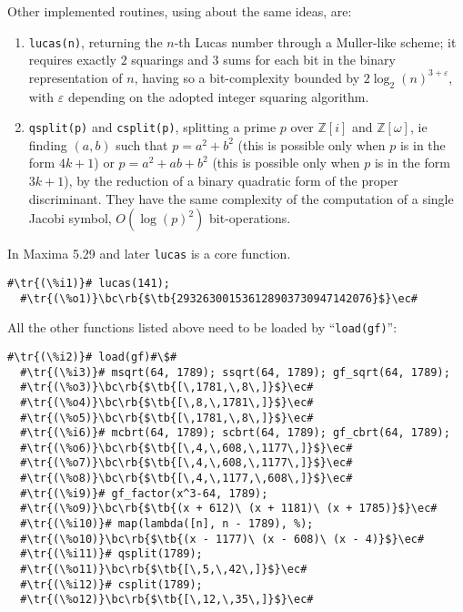 \documentclass[a4paper,11pt,leqno,fleqn]{artikel3}
\newcommand{\bc}{\begin{center}}
\newcommand{\ec}{\end{center}}
\newcommand{\tr}[1]{\textcolor{red}{#1}}
\newcommand{\tb}[1]{\textcolor{blue}{#1}}
\newcommand{\rb}[1]{\raisebox{2mm}[0mm][1mm]{#1}}
\begin{document}
Other implemented routines, using about the same ideas, are:
\begin{enumerate}
\item \verb!lucas(n)!, returning the $n$-th Lucas number through a Muller-like scheme; it requires exactly $2$ squarings and $3$ sums for each bit in the binary representation of $n$, having so a bit-complexity bounded by $2\log_2(n)^{3+\varepsilon}$, with $\varepsilon$ depending on the adopted integer squaring algorithm.
\item \verb!qsplit(p)! and \verb!csplit(p)!, splitting a prime $p$ over $\mathbb{Z}[i]$ and $\mathbb{Z}[\omega]$, ie finding $(a,b)$ such that $p=a^2+b^2$ (this is possible only when $p$ is in the form $4k+1$) or $p=a^2+ab+b^2$ (this is possible only when $p$ is in the form $3k+1$), by the reduction of a binary quadratic form of the proper discriminant. They have the same complexity of the computation of a single Jacobi symbol, $O(\log(p)^2)$ bit-operations.
\end{enumerate}
\vspace{1cm}

In Maxima 5.29 and later \verb!lucas! is a core function.

\vspace*{2mm}
\begin{lstlisting}[escapechar=\#]
  #\tr{(\%i1)}# lucas(141);
  #\tr{(\%o1)}\bc\rb{$\tb{293263001536128903730947142076}$}\ec#
\end{lstlisting}

\vspace*{4mm}
All the other functions listed above need to be loaded by ``\verb!load(gf)!'':

\pagebreak
\begin{lstlisting}[escapechar=\#]
  #\tr{(\%i2)}# load(gf)#\$#
  #\tr{(\%i3)}# msqrt(64, 1789); ssqrt(64, 1789); gf_sqrt(64, 1789);
  #\tr{(\%o3)}\bc\rb{$\tb{[\,1781,\,8\,]}$}\ec#
  #\tr{(\%o4)}\bc\rb{$\tb{[\,8,\,1781\,]}$}\ec#
  #\tr{(\%o5)}\bc\rb{$\tb{[\,1781,\,8\,]}$}\ec#
  #\tr{(\%i6)}# mcbrt(64, 1789); scbrt(64, 1789); gf_cbrt(64, 1789);
  #\tr{(\%o6)}\bc\rb{$\tb{[\,4,\,608,\,1177\,]}$}\ec#
  #\tr{(\%o7)}\bc\rb{$\tb{[\,4,\,608,\,1177\,]}$}\ec#
  #\tr{(\%o8)}\bc\rb{$\tb{[\,4,\,1177,\,608\,]}$}\ec#
  #\tr{(\%i9)}# gf_factor(x^3-64, 1789);
  #\tr{(\%o9)}\bc\rb{$\tb{(x + 612)\ (x + 1181)\ (x + 1785)}$}\ec#
  #\tr{(\%i10)}# map(lambda([n], n - 1789), %);
  #\tr{(\%o10)}\bc\rb{$\tb{(x - 1177)\ (x - 608)\ (x - 4)}$}\ec#
  #\tr{(\%i11)}# qsplit(1789);
  #\tr{(\%o11)}\bc\rb{$\tb{[\,5,\,42\,]}$}\ec#
  #\tr{(\%i12)}# csplit(1789);
  #\tr{(\%o12)}\bc\rb{$\tb{[\,12,\,35\,]}$}\ec#
\end{lstlisting}
\end{document}
